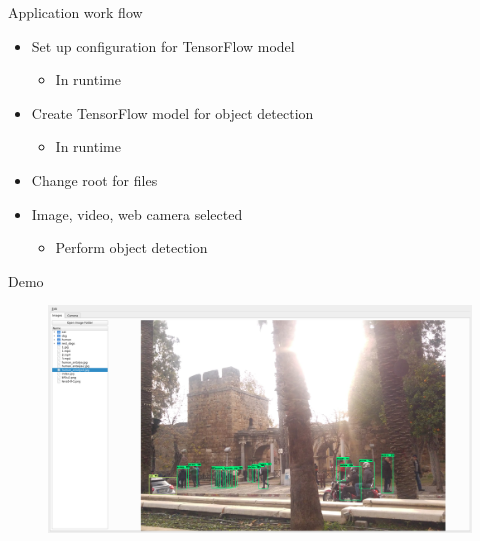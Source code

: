 \begin{frame}{Application work flow}
    \begin{itemize}
        \item Set up configuration for TensorFlow model 
            \begin{itemize}
                \item In runtime
            \end{itemize}
        \item Create TensorFlow model for object detection
            \begin{itemize}
                \item In runtime
            \end{itemize}
        \item Change root for files
        \item Image, video, web camera selected
            \begin{itemize}
                \item Perform object detection
            \end{itemize}
    \end{itemize}
\end{frame}

\begin{frame}{Demo}
    \begin{figure}
        \begin{center}
            \includegraphics[width=1\textwidth]{images/Application.png}
        \end{center}
    \end{figure}
\end{frame}
